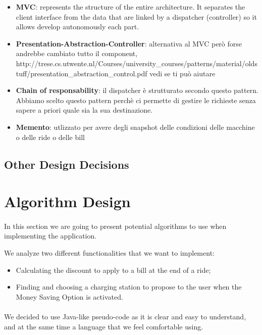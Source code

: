 \documentclass[english]{article}
\begin{document}
\begin{itemize}
\begin{itemize}
  \item{\textbf{MVC}: represents the structure of the entire architecture. It separates the client interface from the data that are linked by a dispatcher (controller) so it allows develop autonomously each part.}
  \item{\textbf{Presentation-Abstraction-Controller}: alternativa al MVC però forse andrebbe cambiato tutto il component, http://trese.cs.utwente.nl/Courses/university_courses/patterns/material/oldstuff/presentation_abstraction_control.pdf vedi se ti può aiutare}
  \item{\textbf{Chain of responsability}: il dispatcher è strutturato secondo questo pattern. Abbiamo scelto questo pattern perchè ci permette di gestire le richieste senza sapere a priori quale sia la sua destinazione.}
  \item{\textbf{Memento}: utlizzato per avere degli snapshot delle condizioni delle macchine o delle ride o delle bill }
\end{itemize}

\subsection{Other Design Decisions}

\newpage

\section{Algorithm Design}

\paragraph{}
In this section we are going to present potential algorithms to use when implementing the application.

We analyze two different functionalities that we want to implement:
\begin{itemize}
	\item{Calculating the discount to apply to a bill at the end of a ride;}
	\item{Finding and choosing a charging station to propose to the user when the Money Saving Option is activated.}
\end{itemize}

\paragraph{}
We decided to use Java-like pseudo-code as it is clear and easy to understand, and at the same time a language that we feel comfortable using.


\end{itemize}
\end{document}

